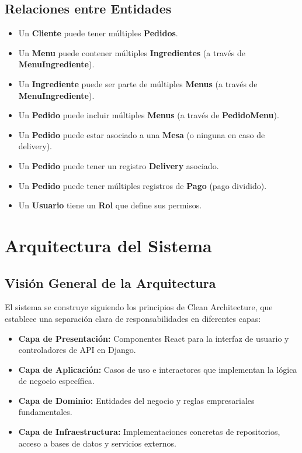 \documentclass[12pt]{article}
\begin{document}
\subsection{Relaciones entre Entidades}
\begin{itemize}
  \item Un \textbf{Cliente} puede tener múltiples \textbf{Pedidos}.
  \item Un \textbf{Menu} puede contener múltiples \textbf{Ingredientes} (a través de \textbf{MenuIngrediente}).
  \item Un \textbf{Ingrediente} puede ser parte de múltiples \textbf{Menus} (a través de \textbf{MenuIngrediente}).
  \item Un \textbf{Pedido} puede incluir múltiples \textbf{Menus} (a través de \textbf{PedidoMenu}).
  \item Un \textbf{Pedido} puede estar asociado a una \textbf{Mesa} (o ninguna en caso de delivery).
  \item Un \textbf{Pedido} puede tener un registro \textbf{Delivery} asociado.
  \item Un \textbf{Pedido} puede tener múltiples registros de \textbf{Pago} (pago dividido).
  \item Un \textbf{Usuario} tiene un \textbf{Rol} que define sus permisos.
\end{itemize}

\section{Arquitectura del Sistema}

\subsection{Visión General de la Arquitectura}
El sistema se construye siguiendo los principios de Clean Architecture, que establece una separación clara de responsabilidades en diferentes capas:

\begin{itemize}
  \item \textbf{Capa de Presentación:} Componentes React para la interfaz de usuario y controladores de API en Django.
  \item \textbf{Capa de Aplicación:} Casos de uso e interactores que implementan la lógica de negocio específica.
  \item \textbf{Capa de Dominio:} Entidades del negocio y reglas empresariales fundamentales.
  \item \textbf{Capa de Infraestructura:} Implementaciones concretas de repositorios, acceso a bases de datos y servicios externos.
\end{itemize}
\end{document}

